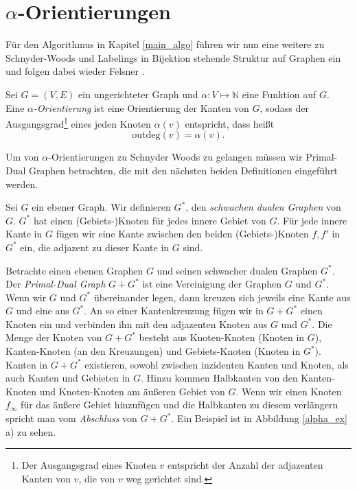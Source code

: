 \section{$\alpha$-Orientierungen}\label{alpha_orientations}

Für den Algorithmus in Kapitel \ref{main_algo} führen wir nun eine weitere zu Schnyder-Woods und Labelings in Bijektion stehende Struktur auf Graphen ein und folgen dabei wieder Felsner \cite{felsner04}.

\begin{definition}
Sei $G=(V,E)$ ein ungerichteter Graph und $\alpha:V\mapsto\mathbb{N}$ eine Funktion auf $G$. Eine $\alpha$\textit{-Orientierung} ist eine Orientierung der Kanten von $G$, sodass der Ausgangsgrad\footnote{Der Ausgangsgrad eines Knoten $v$ entspricht der Anzahl der adjazenten Kanten von $v$, die von $v$ weg gerichtet sind.} eines jeden Knoten $\alpha(v)$ entspricht, dass heißt $$\text{outdeg}(v) = \alpha(v).$$
\end{definition}

Um von $\alpha$-Orientierungen zu Schnyder Woods zu gelangen müssen wir Primal-Dual Graphen betrachten, die mit den nächsten beiden Definitionen eingeführt werden.

\begin{definition}
Sei $G$ ein ebener Graph. Wir definieren $G^*$, den \textit{schwachen dualen Graphen} von $G$. $G^*$ hat einen (Gebiets-)Knoten für jedes innere Gebiet von $G$. Für jede innere Kante in $G$ fügen wir eine Kante zwischen den beiden (Gebiets-)Knoten $f,f'$ in $G^*$ ein, die adjazent zu dieser Kante in $G$ sind.
\end{definition}

\begin{definition}
Betrachte einen ebenen Graphen $G$ und seinen schwacher dualen Graphen $G^*$. Der \textit{Primal-Dual Graph} $G+G^*$ ist eine Vereinigung der Graphen $G$ und $G^*$. Wenn wir $G$ und $G^*$ übereinander legen, dann kreuzen sich jeweils eine Kante aus $G$ und eine aus $G^*$. An so einer Kantenkreuzung fügen wir in $G+G^*$ einen Knoten ein und verbinden ihn mit den adjazenten Knoten aus $G$ und $G^*$. Die Menge der Knoten von $G+G^*$ besteht aus Knoten-Knoten (Knoten in $G$), Kanten-Knoten (an den Kreuzungen) und Gebiets-Knoten (Knoten in $G^*$). Kanten in $G+G^*$ existieren, sowohl zwischen inzidenten Kanten und Knoten, als auch Kanten und Gebieten in $G$. Hinzu kommen Halbkanten von den Kanten-Knoten und Knoten-Knoten am äußeren Gebiet von $G$. Wenn wir einen Knoten $f_\infty$ für das äußere Gebiet hinzufügen und die Halbkanten zu diesem verlängern spricht man vom \textit{Abschluss} von $G+G^*$. Ein Beispiel ist in Abbildung \ref{alpha_ex} a) zu sehen.

\end{definition}

